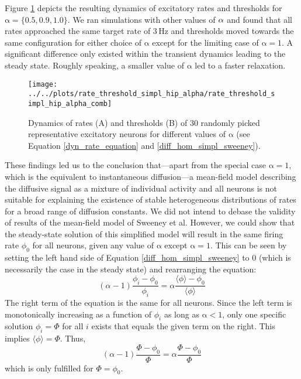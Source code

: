 \documentclass[10pt,a4paper]{article}
\begin{document}
Figure \ref{dynamics_rate_threshold_dyn_mean_field_sweeney} depicts the resulting dynamics of excitatory rates and thresholds for $\mathrm{\alpha=\lbrace 0.5,0.9,1.0\rbrace}$. We ran simulations with other values of $\rm \alpha$ and found that all rates approached the same target rate of $\mathrm{3\,Hz}$ and thresholds moved towards the same configuration for either choice of $\mathrm{\alpha}$ except for the limiting case of $\mathrm{\alpha=1}$. A significant difference only existed within the transient dynamics leading to the steady state. Roughly speaking, a smaller value of $\mathrm{\alpha}$ led to a faster relaxation.
\begin{figure}
\texttt{[image: ../../plots/rate\_threshold\_simpl\_hip\_alpha/rate\_threshold\_simpl\_hip\_alpha\_comb]}
\caption[Rate and threshold dynamics of excitatory population]{Dynamics of rates (A) and thresholds (B) of 30 randomly picked representative excitatory neurons for different values of $\mathrm{\alpha}$ (see Equation \eqref{dyn_rate_equation} and \eqref{diff_hom_simpl_sweeney}).}
\label{dynamics_rate_threshold_dyn_mean_field_sweeney}
\end{figure}
These findings led us to the conclusion that---apart from the special case $\mathrm{\alpha=1}$, which is the equivalent to instantaneous diffusion---a mean-field model describing the diffusive signal as a mixture of individual activity and all neurons is not suitable for explaining the existence of stable heterogeneous distributions of rates for a broad range of diffusion constants. We did not intend to debase the validity of results of the mean-field model of Sweeney et al. However, we could show that the steady-state solution of this simplified model will result in the same firing rate $\phi_0$ for all neurons, given any value of $\mathrm{\alpha}$ except $\mathrm{\alpha=1}$. This can be seen by setting the left hand side of Equation \eqref{diff_hom_simpl_sweeney} to $0$ (which is necessarily the case in the steady state) and rearranging the equation:
\begin{equation}
(\alpha-1)\frac{\phi_i - \phi_0}{\phi_i} = \alpha \frac{\langle \phi \rangle - \phi_0}{\langle \phi \rangle}
\label{diff_hom_simpl_sweeney_2}
\end{equation}
The right term of the equation is the same for all neurons. Since the left term is monotonically increasing as a function of $\phi_i$ as long as $\mathrm{\alpha<1}$, only one specific solution $\phi_i = \Phi$ for all $i$ exists that equals the given term on the right. This implies $\langle \phi \rangle = \Phi$. Thus,
\begin{equation}
(\alpha-1)\frac{\Phi - \phi_0}{\Phi} = \alpha \frac{\Phi - \phi_0}{\Phi}
\label{diff_hom_simpl_sweeney_3}
\end{equation}
which is only fulfilled for $\Phi = \phi_0$.
\end{document}
